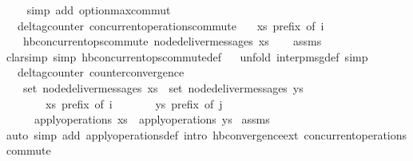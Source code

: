 \begin{isabellebody}
\ \ \isamarkupfalse%
\ {\isacharparenleft}simp\ add{\isacharcolon}\ option{\isacharunderscore}max{\isacharunderscore}commut{\isacharparenright}\isanewline
\ \ \isamarkupfalse%
%
\endisatagproof
{\isafoldproof}%
%
\isadelimproof
\isanewline
%
\endisadelimproof
\isanewline
{}\isamarkupfalse%
\ {\isacharparenleft}\ delta{\isacharunderscore}gcounter{\isacharparenright}\ concurrent{\isacharunderscore}operations{\isacharunderscore}commute{\isacharcolon}\isanewline
\ \ \ {\isachardoublequoteopen}xs\ prefix\ of\ i{\isachardoublequoteclose}\isanewline
\ \ \ {\isachardoublequoteopen}hb{\isachardot}concurrent{\isacharunderscore}ops{\isacharunderscore}commute\ {\isacharparenleft}node{\isacharunderscore}deliver{\isacharunderscore}messages\ xs{\isacharparenright}{\isachardoublequoteclose}\isanewline
%
\isadelimproof
\ \ %
\endisadelimproof
%
\isatagproof
{}\isamarkupfalse%
\ assms\isanewline
\ \ \isamarkupfalse%
{\isacharparenleft}clarsimp\ simp{\isacharcolon}\ hb{\isachardot}concurrent{\isacharunderscore}ops{\isacharunderscore}commute{\isacharunderscore}def{\isacharparenright}\isanewline
\ \ \isamarkupfalse%
{\isacharparenleft}unfold\ interp{\isacharunderscore}msg{\isacharunderscore}def{\isacharcomma}\ simp{\isacharparenright}\isanewline
\ \ \isamarkupfalse%
%
\endisatagproof
{\isafoldproof}%
%
\isadelimproof
\isanewline
%
\endisadelimproof
\isanewline
{}\isamarkupfalse%
\ {\isacharparenleft}\ delta{\isacharunderscore}gcounter{\isacharparenright}\ counter{\isacharunderscore}convergence{\isacharcolon}\isanewline
\ \ \ {\isachardoublequoteopen}set\ {\isacharparenleft}node{\isacharunderscore}deliver{\isacharunderscore}messages\ xs{\isacharparenright}\ {\isacharequal}\ set\ {\isacharparenleft}node{\isacharunderscore}deliver{\isacharunderscore}messages\ ys{\isacharparenright}{\isachardoublequoteclose}\isanewline
\ \ \ \ \ \ \ {\isachardoublequoteopen}xs\ prefix\ of\ i{\isachardoublequoteclose}\isanewline
\ \ \ \ \ \ \ {\isachardoublequoteopen}ys\ prefix\ of\ j{\isachardoublequoteclose}\isanewline
\ \ \ \ \ {\isachardoublequoteopen}apply{\isacharunderscore}operations\ xs\ {\isacharequal}\ apply{\isacharunderscore}operations\ ys{\isachardoublequoteclose}\isanewline
%
\isadelimproof
%
\endisadelimproof
%
\isatagproof
{}\isamarkupfalse%
\ assms\ \isamarkupfalse%
{\isacharparenleft}auto\ simp\ add{\isacharcolon}\ apply{\isacharunderscore}operations{\isacharunderscore}def\ intro{\isacharcolon}\ hb{\isachardot}convergence{\isacharunderscore}ext\ concurrent{\isacharunderscore}operations{\isacharunderscore}commute\isanewline

\end{isabellebody}
